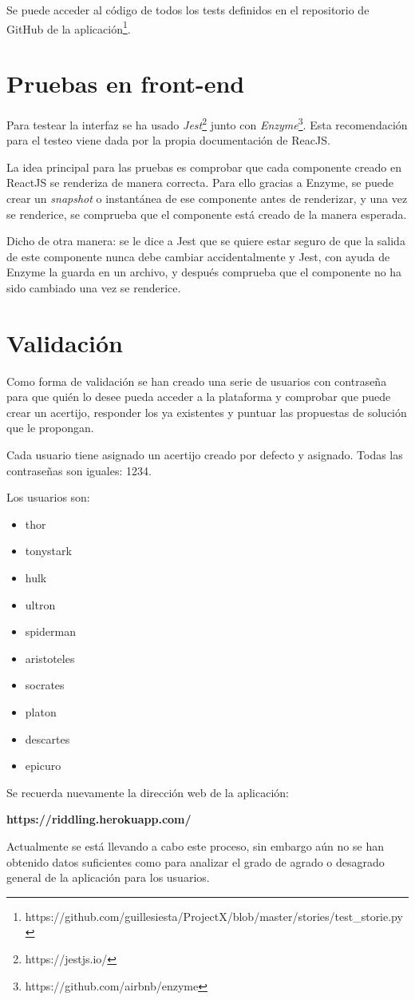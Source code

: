 Se puede acceder al código de todos los tests definidos en el repositorio de GitHub de la aplicación\footnote{https://github.com/guillesiesta/ProjectX/blob/master/stories/test\_storie.py}. 

\section{Pruebas en front-end}

Para testear la interfaz se ha usado \textit{Jest}\footnote{https://jestjs.io/} junto con \textit{Enzyme}\footnote{https://github.com/airbnb/enzyme}. Esta recomendación para el testeo viene dada por la propia documentación de ReacJS\cite{testreact}.

La idea principal para las pruebas es comprobar que cada componente creado en ReactJS se renderiza de manera correcta. Para ello gracias a Enzyme, se puede crear un \textit{snapshot} o instantánea de ese componente antes de renderizar, y una vez se renderice, se comprueba que el componente está creado de la manera esperada\cite{testreact2}.

Dicho de otra manera: se le dice a Jest que se quiere estar seguro de que la salida de este componente nunca debe cambiar accidentalmente y Jest, con ayuda de Enzyme la guarda en un archivo, y después comprueba que el componente no ha sido cambiado una vez se renderice.

\section{Validación}

Como forma de validación se han creado una serie de usuarios con contraseña para que quién lo desee pueda acceder a la plataforma y comprobar que puede crear un acertijo, responder los ya existentes y puntuar las propuestas de solución que le propongan.

Cada usuario tiene asignado un acertijo creado por defecto y asignado. Todas las contraseñas son iguales: 1234.

Los usuarios son:
\begin{itemize}
    \item thor
    \item tonystark
    \item hulk
    \item ultron
    \item spiderman
    \item aristoteles
    \item socrates
    \item platon
    \item descartes
    \item epicuro
\end{itemize}

Se recuerda nuevamente la dirección web de la aplicación:

\textbf{https://riddling.herokuapp.com/}

Actualmente se está llevando a cabo este proceso, sin embargo aún no se han obtenido datos suficientes como para analizar el grado de agrado o desagrado general de la aplicación para los usuarios. 